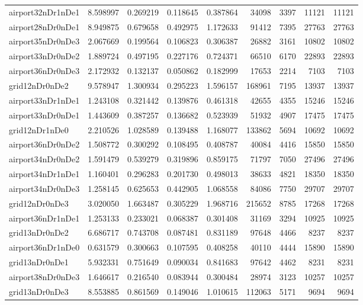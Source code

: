 \begin{longtable}{|l|r|r|r|r|r|r|r|r|}
airport32nDr1nDe1 & 8.598997 & 0.269219 & 0.118645 & 0.387864 & 34098 & 3397 & 11121 & 11121 \\
airport28nDr0nDe1 & 8.949875 & 0.679658 & 0.492975 & 1.172633 & 91412 & 7395 & 27763 & 27763 \\
airport35nDr0nDe3 & 2.067669 & 0.199564 & 0.106823 & 0.306387 & 26882 & 3161 & 10802 & 10802 \\
airport33nDr0nDe2 & 1.889724 & 0.497195 & 0.227176 & 0.724371 & 66510 & 6170 & 22893 & 22893 \\
airport36nDr0nDe3 & 2.172932 & 0.132137 & 0.050862 & 0.182999 & 17653 & 2214 & 7103 & 7103 \\
grid12nDr0nDe2 & 9.578947 & 1.300934 & 0.295223 & 1.596157 & 168961 & 7195 & 13937 & 13937 \\
airport33nDr1nDe1 & 1.243108 & 0.321442 & 0.139876 & 0.461318 & 42655 & 4355 & 15246 & 15246 \\
airport33nDr0nDe1 & 1.443609 & 0.387257 & 0.136682 & 0.523939 & 51932 & 4907 & 17475 & 17475 \\
grid12nDr1nDe0 & 2.210526 & 1.028589 & 0.139488 & 1.168077 & 133862 & 5694 & 10692 & 10692 \\
airport36nDr0nDe2 & 1.508772 & 0.300292 & 0.108495 & 0.408787 & 40084 & 4416 & 15850 & 15850 \\
airport34nDr0nDe2 & 1.591479 & 0.539279 & 0.319896 & 0.859175 & 71797 & 7050 & 27496 & 27496 \\
airport34nDr1nDe1 & 1.160401 & 0.296283 & 0.201730 & 0.498013 & 38633 & 4821 & 18350 & 18350 \\
airport34nDr0nDe3 & 1.258145 & 0.625653 & 0.442905 & 1.068558 & 84086 & 7750 & 29707 & 29707 \\
grid12nDr0nDe3 & 3.020050 & 1.663487 & 0.305229 & 1.968716 & 215652 & 8785 & 17268 & 17268 \\
airport36nDr1nDe1 & 1.253133 & 0.233021 & 0.068387 & 0.301408 & 31169 & 3294 & 10925 & 10925 \\
grid13nDr0nDe2 & 6.686717 & 0.743708 & 0.087481 & 0.831189 & 97648 & 4466 & 8237 & 8237 \\
airport36nDr1nDe0 & 0.631579 & 0.300663 & 0.107595 & 0.408258 & 40110 & 4444 & 15890 & 15890 \\
grid13nDr0nDe1 & 5.932331 & 0.751649 & 0.090034 & 0.841683 & 97642 & 4462 & 8231 & 8231 \\
airport38nDr0nDe3 & 1.646617 & 0.216540 & 0.083944 & 0.300484 & 28974 & 3123 & 10257 & 10257 \\
grid13nDr0nDe3 & 8.553885 & 0.861569 & 0.149046 & 1.010615 & 112063 & 5171 & 9694 & 9694 \\

\end{longtable}

